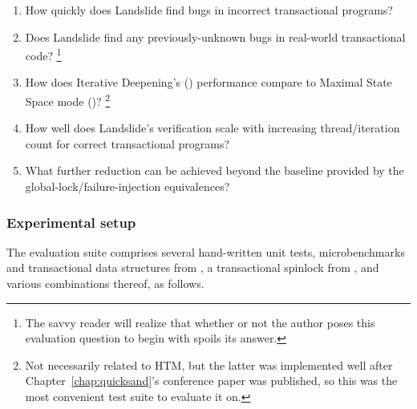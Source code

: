 
\begin{enumerate}
	\item How quickly does Landslide find bugs in incorrect transactional programs? %
	\item Does Landslide find any previously-unknown bugs in real-world transactional code?%
		\footnote{The savvy reader will realize that whether or not the author poses this evaluation question to begin with spoils its answer.}
	\item How does Iterative Deepening's (\sect{\ref{sec:quicksand-id}})
		performance compare to Maximal State Space mode (\sect{\ref{sec:landslide-quicksand-options}})?%
		\footnote{Not necessarily related to HTM,
		but the latter was implemented well after Chapter~\ref{chap:quicksand}'s conference paper was published,
		so this was the most convenient test suite to evaluate it on.}
	\item How well does Landslide's verification scale
		with increasing thread/iteration count for correct transactional programs?
	\item What further reduction can be achieved beyond the baseline provided by
		the global-lock/failure-injection equivalences?
\end{enumerate}

\subsubsection{Experimental setup}

The evaluation suite comprises several hand-written unit tests,
microbenchmarks and transactional data structures from \cite{tm-benchmark-cmu},
a transactional spinlock from \cite{spinlock-rtm-github},
and various combinations thereof,
as follows.


